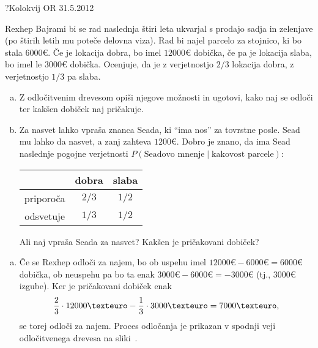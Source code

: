 \begin{naloga}{?}{Kolokvij OR 31.5.2012}
\begin{vprasanje}
Rexhep Bajrami bi se rad naslednja štiri leta
ukvarjal s prodajo sadja in zelenjave
(po štirih letih mu poteče delovna viza).
Rad bi najel parcelo za stojnico, ki bo stala $6000 €$.
Če je lokacija dobra, bo imel $12000 €$ dobička,
če pa je lokacija slaba, bo imel le $3000 €$ dobička.
Ocenjuje, da je z verjetnostjo $2/3$ lokacija dobra,
z verjetnostjo $1/3$ pa slaba.
\begin{enumerate}[(a)]
\item Z odločitvenim drevesom opiši njegove možnosti in ugotovi,
kako naj se odloči ter kakšen dobiček naj pričakuje.
\item Za nasvet lahko vpraša znanca Seada, ki ``ima nos'' za tovrstne posle.
Sead mu lahko da nasvet, a zanj zahteva $1200 €$.
Dobro je znano, da ima Sead naslednje pogojne verjetnosti
$P(\text{Seadovo mnenje} \; | \; \text{kakovost parcele})$:
\begin{center}
\begin{tabular}{c|cc}
& dobra & slaba \\
\hline
priporoča & $2/3$ & $1/2$ \\
odsvetuje & $1/3$ & $1/2$
\end{tabular}
\end{center}
Ali naj vpraša Seada za nasvet?
Kakšen je pričakovani dobiček?
\end{enumerate}
\end{vprasanje}

\begin{odgovor}
\begin{enumerate}[(a)]
\item Če se Rexhep odloči za najem,
bo ob uspehu imel $12000 € - 6000 € = 6000 €$ dobička,
ob neuspehu pa bo ta enak $3000 € - 6000 € = -3000 €$
(tj., $3000 €$ izgube).
Ker je pričakovani dobiček enak
$$
{2 \over 3} \cdot 12000 € - {1 \over 3} \cdot 3000 € = 7000 € ,
$$
se torej odloči za najem.
Proces odločanja je prikazan
v spodnji veji od\-lo\-čit\-ve\-ne\-ga drevesa na sliki~\fig.


\end{enumerate}
\end{odgovor}
\end{naloga}
